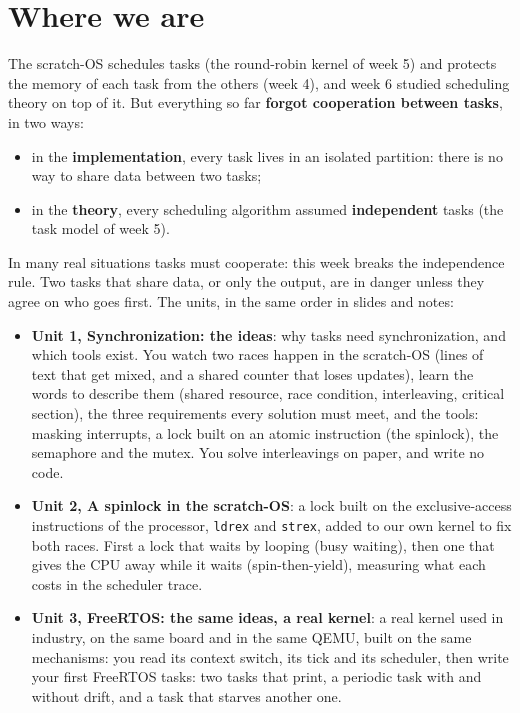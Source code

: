 \section{Where we are}
The scratch-OS schedules tasks (the round-robin kernel of week 5) and protects the memory of each task from the others (week 4), and week 6 studied scheduling theory on top of it. But everything so far \textbf{forgot cooperation between tasks}, in two ways:
\begin{itemize}
    \item in the \textbf{implementation}, every task lives in an isolated partition: there is no way to share data between two tasks;
    \item in the \textbf{theory}, every scheduling algorithm assumed \textbf{independent} tasks (the task model of week 5).
\end{itemize}
In many real situations tasks must cooperate: this week breaks the independence rule. Two tasks that share data, or only the output, are in danger unless they agree on who goes first. The units, in the same order in slides and notes:
\begin{itemize}
    \item \textbf{Unit 1, Synchronization: the ideas}: why tasks need synchronization, and which tools exist. You watch two races happen in the scratch-OS (lines of text that get mixed, and a shared counter that loses updates), learn the words to describe them (shared resource, race condition, interleaving, critical section), the three requirements every solution must meet, and the tools: masking interrupts, a lock built on an atomic instruction (the spinlock), the semaphore and the mutex. You solve interleavings on paper, and write no code.
    \item \textbf{Unit 2, A spinlock in the scratch-OS}: a lock built on the exclusive-access instructions of the processor, \texttt{ldrex} and \texttt{strex}, added to our own kernel to fix both races. First a lock that waits by looping (busy waiting), then one that gives the CPU away while it waits (spin-then-yield), measuring what each costs in the scheduler trace.
    \item \textbf{Unit 3, FreeRTOS: the same ideas, a real kernel}: a real kernel used in industry, on the same board and in the same QEMU, built on the same mechanisms: you read its context switch, its tick and its scheduler, then write your first FreeRTOS tasks: two tasks that print, a periodic task with and without drift, and a task that starves another one.
\end{itemize}

